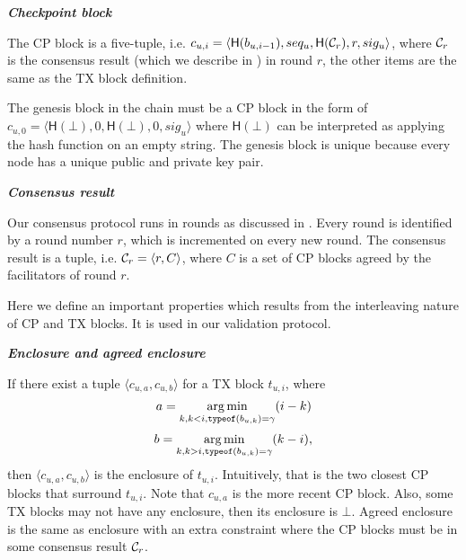 
\begin{definition}
\textbf{\emph{Checkpoint block}}

The CP block is a five-tuple, 
i.e. $c_{u, i} = \langle \textsf{H}(b_{u, i-1}), seq_u, \textsf{H}(\mathcal{C}_r), r, sig_u \rangle$,
where $\mathcal{C}_r$ is the consensus result (which we describe in ) in round $r$, the other items are the same as the TX block definition.

The genesis block in the chain must be a CP block in the form of
$c_{u, 0} = \langle \textsf{H}(\bot), 0,  \textsf{H}(\bot), 0, sig_u \rangle$
where $\textsf{H}(\bot)$ can be interpreted as applying the hash function on an empty string.
The genesis block is unique because every node has a unique public and private key pair.
\end{definition}


\begin{definition}
\label{sec:consensus-result}
\textbf{\emph{Consensus result}}

Our consensus protocol runs in rounds as discussed in .
Every round is identified by a round number $r$, which is incremented on every new round.
The consensus result is a tuple, i.e. $\mathcal{C}_r = \langle r, C \rangle$,
where $C$ is a set of CP blocks agreed by the facilitators of round $r$.
\end{definition}

Here we define an important properties which results from the interleaving nature of CP and TX blocks.
It is used in our validation protocol.
\begin{definition}
\textbf{\emph{Enclosure and agreed enclosure}}

If there exist a tuple $\langle c_{u,a}, c_{u, b} \rangle$ for a TX block $t_{u, i}$,
where 
$$a = \operatorname*{arg\,min}_{k, k < i, \texttt{typeof}(b_{u,k}) = \gamma}(i - k)$$
$$b = \operatorname*{arg\,min}_{k, k > i, \texttt{typeof}(b_{u,k}) = \gamma}(k - i),$$
then $\langle c_{u,a}, c_{u, b} \rangle$ is the enclosure of $t_{u, i}$.
Intuitively, that is the two closest CP blocks that surround $t_{u, i}$.
Note that $c_{u, a}$ is the more recent CP block.
Also, some TX blocks may not have any enclosure, then its enclosure is $\bot$.
Agreed enclosure is the same as enclosure with an extra constraint where the CP blocks must be in some consensus result $\mathcal{C}_r$.

\end{definition}

